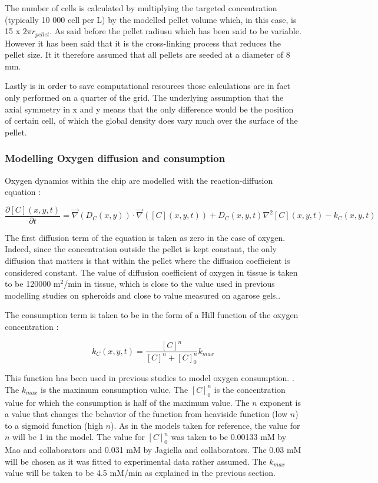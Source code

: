 \documentclass[11pt,a4paper]{article}
\begin{document}
 The number of cells is calculated by multiplying the targeted concentration (typically 10 000 cell per \textmu L) by the modelled pellet volume which, in this case, is 15 x $2 \pi r_{pellet}$. As said before the pellet radiusu which has been said to be variable. However it has been said that it is the cross-linking process that reduces the pellet size. It it therefore assumed that all pellets are seeded at a diameter of 8 mm.
 
Lastly is in order to save computational resources those calculations are in fact only performed on a quarter of the grid. The underlying assumption that the axial symmetry in x and y means that the only difference would be the position of certain cell, of which the global density does vary much over the surface of the pellet.

\subsubsection{Modelling Oxygen diffusion and consumption}
Oxygen dynamics within the chip are modelled with the reaction-diffusion equation :

\[ \frac{\partial [C](x,y,t)}{\partial t} = \overrightarrow{\nabla}(D_C(x,y)) \cdot \overrightarrow{\nabla}( [C](x,y,t)) + D_C(x,y,t) \nabla^2 [C](x,y,t) -k_C(x,y,t) \] 

The first diffusion term of the equation is taken as zero in the case of oxygen. Indeed, since the concentration outside the pellet is kept constant, the only diffusion that matters is that within the pellet where the diffusion coefficient is considered constant. The value of diffusion coefficient of oxygen in tissue is taken to be 120000 \textmu m$^2$/min in tissue, which is close to the value used in previous modelling studies on spheroids\cite{Mao2018}\cite{Kempf2015} and close to value measured on agarose gels.\cite{McCabe1975}\cite{Figueiredo2018}.

The consumption term is taken to be in the form of a Hill function of the oxygen concentration : 

\[ k_C(x,y,t) = \frac{[C]^n}{[C]^n + [C]^n_{0}}k_{max}  \]

This function has been used in previous studies to model oxygen consumption. \cite{Mao2018}\cite{Kempf2015}\cite{Jagiella2016}. The $k_{max}$ is the maximum consumption value. The $[C]^n_{0}$ is the concentration value for which the consumption is half of the maximum value. The $n$  exponent is a value that changes the behavior of the function from heaviside function (low $n$) to a sigmoid function (high $n$). As in the models taken for reference, the value for $n$ will be 1 in the model. The value for $[C]^n_{0}$ was taken to be 0.00133 mM by Mao and collaborators and 0.031 mM by Jagiella and collaborators.\cite{Mao2018}\cite{Jagiella2016} The 0.03 mM will be chosen as it was fitted to experimental data rather assumed. The $k_{max}$ value will be taken to be 4.5 mM/min as explained in the previous section. 
\end{document}
